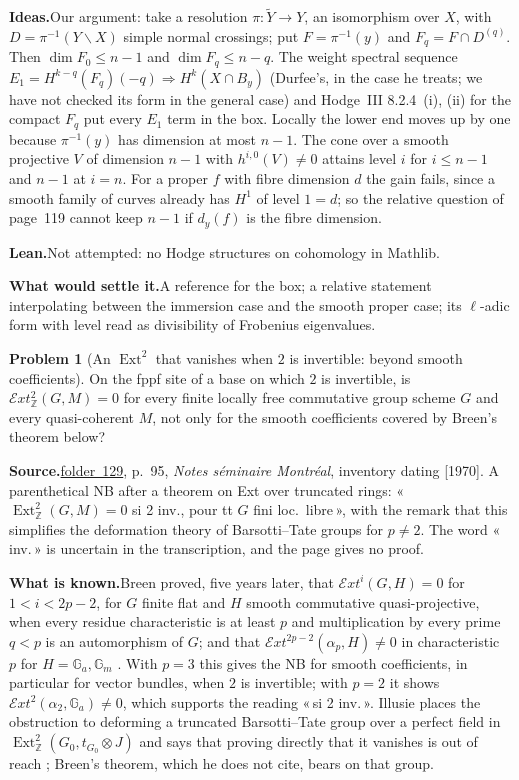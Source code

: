 \documentclass[11pt]{article}
\newcommand{\q}[1]{«\,#1\,»}
\newcommand{\fac}[1]{\href{https://grothendieck.umontpellier.fr/#1.pdf}{folder~#1}}
\newcommand{\Ext}{\operatorname{Ext}}
\theoremstyle{definition}
\newtheorem{problem}{Problem}
\theoremstyle{plain}\newtheorem*{proposition}{Proposition}\theoremstyle{definition}
\newcommand{\entry}[1]{\par\medskip\noindent\textbf{#1}\enspace}
\newcommand{\src}[1]{\entry{Source.}#1}
\newcommand{\known}{\entry{What is known.}}
\newcommand{\ideas}{\entry{Ideas.}}
\newcommand{\leanst}{\entry{Lean.}}
\newcommand{\settle}{\entry{What would settle it.}}
\begin{document}
\ideas Our argument: take a resolution $\pi : \tilde Y \to Y$, an isomorphism over $X$, with $D = \pi^{-1}(Y \smallsetminus X)$ simple normal crossings; put $F = \pi^{-1}(y)$ and $F_q = F \cap D^{(q)}$. Then $\dim F_0 \le n-1$ and $\dim F_q \le n-q$. The weight spectral sequence $E_1 = H^{k-q}(F_q)(-q) \Rightarrow H^k(X \cap B_y)$ (Durfee's, in the case he treats; we have not checked its form in the general case) and Hodge~III 8.2.4~(i), (ii) for the compact $F_q$ put every $E_1$ term in the box. Locally the lower end moves up by one because $\pi^{-1}(y)$ has dimension at most $n-1$. The cone over a smooth projective $V$ of dimension $n-1$ with $h^{i,0}(V) \ne 0$ attains level $i$ for $i \le n-1$ and $n-1$ at $i = n$. For a proper $f$ with fibre dimension $d$ the gain fails, since a smooth family of curves already has $H^1$ of level $1 = d$; so the relative question of page~119 cannot keep $n-1$ if $d_y(f)$ is the fibre dimension.

\leanst Not attempted: no Hodge structures on cohomology in Mathlib.

\settle A reference for the box; a relative statement interpolating between the immersion case and the smooth proper case; its $\ell$-adic form with level read as divisibility of Frobenius eigenvalues.

\begin{problem}[An $\Ext^2$ that vanishes when $2$ is invertible: beyond smooth coefficients]\label{p:ext2}
On the fppf site of a base on which $2$ is invertible, is $\mathcal Ext^2_{\mathbb Z}(G, M) = 0$ for every finite locally free commutative group scheme $G$ and every quasi-coherent $M$, not only for the smooth coefficients covered by Breen's theorem below?
\end{problem}

\src{\fac{129}, p.~95, \emph{Notes séminaire Montréal}, inventory dating [1970]. A parenthetical NB after a theorem on Ext over truncated rings: \q{$\Ext^2_{\mathbb Z}(G, M) = 0$ si 2 inv., pour tt $G$ fini loc.\ libre}, with the remark that this simplifies the deformation theory of Barsotti--Tate groups for $p \ne 2$. The word \q{inv.} is uncertain in the transcription, and the page gives no proof.}

\known Breen proved, five years later, that $\mathcal Ext^i(G, H) = 0$ for $1 < i < 2p-2$, for $G$ finite flat and $H$ smooth commutative quasi-projective, when every residue characteristic is at least $p$ and multiplication by every prime $q < p$ is an automorphism of $G$; and that $\mathcal Ext^{2p-2}(\alpha_p, H) \ne 0$ in characteristic~$p$ for $H = \mathbb G_a, \mathbb G_m$ \cite{breen1975}. With $p = 3$ this gives the NB for smooth coefficients, in particular for vector bundles, when $2$ is invertible; with $p = 2$ it shows $\mathcal Ext^2(\alpha_2, \mathbb G_a) \ne 0$, which supports the reading \q{si 2 inv.}. Illusie places the obstruction to deforming a truncated Barsotti--Tate group over a perfect field in $\Ext^2_{\mathbb Z}(G_0, t_{G_0} \otimes J)$ and says that proving directly that it vanishes is out of reach \cite[p.~2]{illusie2023}; Breen's theorem, which he does not cite, bears on that group.
\end{document}
